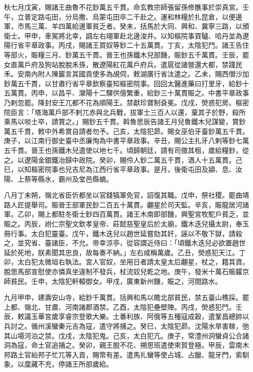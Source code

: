 \begin{pinyinscope}
 秋七月戊寅，賜諸王曲魯不花鈔萬五千貫。命玄教宗師張留孫修醮事於崇真宮。壬午，立普定路屯田，分烏撒、烏蒙屯田卒二千赴之。運和林糧於扎昆倉，以便邊軍，市馬三萬、羊四萬給邊軍貧乏者。癸未，括馬於大同、興和、冀寧三路，以頒衛士。甲申，車駕將北幸，調左右翊軍赴北邊浚井。以知樞院事買驢、哈丹並為遼陽行省平章政事。丙戌，賜諸王買奴等鈔二十五萬貫。丁亥，太陰犯鬥。諸王告住等部火，賑糧三月、鈔萬五千貫。晉王也孫鐵木兒部饑，賑鈔五千萬貫。壬辰，罷女直萬戶府及狗站脫脫禾孫，散遼陽紅花萬戶府兵。遣扈從諸營還大都，禁踐民禾。安南內附人陳巖言其國貢使多為覘伺，敕湖廣行省汰遣之。乙未，賜西僧沙加鈔萬五千貫，以甘肅行省平章欽察臺知樞密院事。回回太醫進藥曰打里牙，給鈔十五萬貫。丙申，以昌平、灤陽十二驛供億繁重，給鈔三十萬貫賑之。中書平章政事乃剌忽罷。降封安王兀都不花為順陽王。禁獻珍寶制袞冕。戊戌，熒惑犯房。樞密院臣言：「塔海萬戶部不剌兀赤與北兵戰，拔軍士三百人以還，棄其子於野，殺所乘馬以啖士卒，請賞之。」賜鈔五千貫。斡魯思辰告諸王月兒魯鐵木兒謀變，賞鈔萬五千貫，敕中外希賞自請者勿予。己亥，太陰犯昴。賜女巫伯牙臺鈔萬五千貫。庚子，以江南行御史臺中丞廉恂為中書平章政事。辛丑，賜公主扎牙八剌等鈔七萬五千貫。晉王也孫鐵木兒遣使以地七千。頃歸朝廷，請有司徵其租，歲給糧鈔，從之。以遼陽金銀鐵冶歸中政院。癸卯，賜伶人鈔二萬五千貫，酒人十五萬貫。己巳，以知樞密院事也兒吉尼為江西行省平章政事。是月，後衛屯田及潁、息、汝陽、上蔡等縣水，霸州及堂邑縣蝻。



 八月丁未朔，嶺北省臣忻都坐以官錢犒軍免官，詔復其職。戊申，祭社稷。罷曲靖路人匠提舉司。賑晉王部軍民鈔二百五十萬貫。翽星於司天監。辛亥，賑龍居河諸軍。乙卯，賜上都駐冬衛士鈔四百萬貫。諸王木南即部饑，興聖宮牧駝戶貧乏，並賑之。丙辰，祔仁宗聖文欽孝皇帝、莊懿慈聖皇后於太廟，鐵木迭兒攝太尉，奉玉冊行事。太白犯靈臺。戊午，鐵木迭兒以趙世延嘗劾其奸，誣以不敬下獄，請殺之，並究省、臺諸臣，不允。帝幸涼亭，從容謂近侍曰：「頃鐵木迭兒必欲置趙世延於死地，朕素聞其忠良，故每奏不納。」左右咸稱萬歲。乙丑，熒惑犯天江。丁卯，太白犯太微垣右執法。宮人官奴，坐用日者請太皇太后翽星，杖之，籍其資。脫思馬部宣慰使亦憐真坐違制不發兵，杖流奴兒乾之地。庚午，發米十萬石賑糶京師貧民。壬申，太陰犯軒轅御女。甲戌，廣東新州饑，賑之，河間路水。



 九月甲申，建壽安山寺，給鈔千萬貫。括興和馬以贍北部貧民，禁五臺山樵採。罷上都、嶺北、甘肅、河南諸郡酒禁。乙酉，太陰犯壘壁陣。丙戌，熒惑犯鬥。壬辰，敕議玉華宮歲享睿宗登歌大樂。土番利族、阿俄等五種寇成穀，遣鞏昌總帥以兵討之。循州溪蠻秦元吉為寇，遣守將捕之。癸巳，太陰犯昴。沈陽水旱害稼，弛其山場河泊之禁。戊戌，太陰犯鬼。己亥，太白犯亢。庚子，常澧州洞蠻貞公合諸洞為寇，命土官追捕之。癸卯，親王脫不花、搠思班遣使來賀登極。甲辰，雲南木邦路土官紿邦子忙兀等入貢，賜幣有差。遣馬扎蠻等使占城、占臘、龍牙門，索馴象。以廩藏不充，停諸王所部歲給。




\end{pinyinscope}
